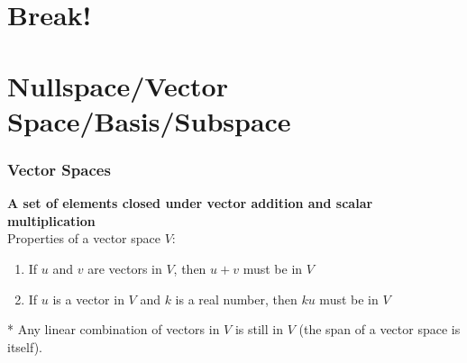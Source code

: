 \documentclass{beamer}
\begin{document}

\section*{Break!}

\section*{Nullspace/Vector Space/Basis/Subspace}

\begin{frame}
    \frametitle{Vector Spaces}
    \textbf{A set of elements closed under vector addition and scalar multiplication} \\
    Properties of a vector space $V$: \\
    \begin{enumerate}
        \item If $u$ and $v$ are vectors in $V$, then $u+v$ must be in $V$ \\
        \item If $u$ is a vector in $V$ and $k$ is a real number, then $ku$ must be in $V$ \\
    \end{enumerate}
    * Any linear combination of vectors in $V$ is still in $V$ (the span of a vector space is itself).
\end{frame}
\end{document}
